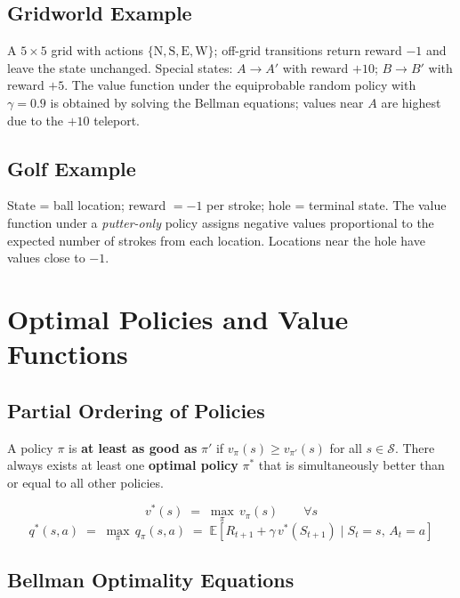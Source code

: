 \documentclass[11pt,a4paper]{article}
\theoremstyle{definition}
\theoremstyle{plain}
\theoremstyle{remark}
\begin{document}
\subsection{Gridworld Example}

A $5 \times 5$ grid with actions $\{\text{N}, \text{S}, \text{E}, \text{W}\}$; off-grid transitions return reward $-1$ and leave the state unchanged. Special states: $A \to A'$ with reward $+10$; $B \to B'$ with reward $+5$. The value function under the equiprobable random policy with $\gamma = 0.9$ is obtained by solving the Bellman equations; values near $A$ are highest due to the $+10$ teleport.

\subsection{Golf Example}

State = ball location; reward $= -1$ per stroke; hole = terminal state. The value function under a \emph{putter-only} policy assigns negative values proportional to the expected number of strokes from each location. Locations near the hole have values close to $-1$.

\section{Optimal Policies and Value Functions}

\subsection{Partial Ordering of Policies}

A policy $\pi$ is \textbf{at least as good as} $\pi'$ if $v_\pi(s) \geq v_{\pi'}(s)$ for all $s \in \mathcal{S}$. There always exists at least one \textbf{optimal policy} $\pi^*$ that is simultaneously better than or equal to all other policies.

\begin{tcolorbox}[colback=blue!5!white, colframe=blue!60!black, title={Optimal Value Functions}]
\[
    v^*(s) \;=\; \max_\pi\, v_\pi(s) \qquad \forall s
\]
\[
    q^*(s, a) \;=\; \max_\pi\, q_\pi(s, a)
    \;=\; \mathbb{E}\!\left[R_{t+1} + \gamma\, v^*(S_{t+1}) \mid S_t = s,\, A_t = a\right]
\]
\end{tcolorbox}

\subsection{Bellman Optimality Equations}
\end{document}
